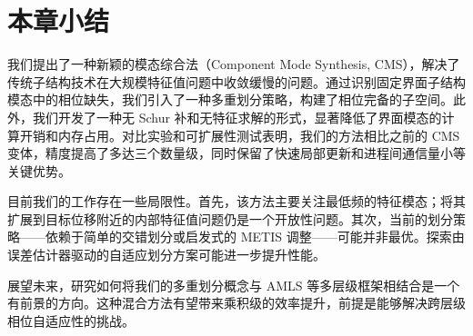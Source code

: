\section{本章小结}
我们提出了一种新颖的模态综合法（Component Mode Synthesis, CMS），解决了传统子结构技术在大规模特征值问题中收敛缓慢的问题。通过识别固定界面子结构模态中的相位缺失，我们引入了一种多重划分策略，构建了相位完备的子空间。此外，我们开发了一种无 Schur 补和无特征求解的形式，显著降低了界面模态的计算开销和内存占用。对比实验和可扩展性测试表明，我们的方法相比之前的 CMS 变体，精度提高了多达三个数量级，同时保留了快速局部更新和进程间通信量小等关键优势。

目前我们的工作存在一些局限性。首先，该方法主要关注最低频的特征模态；将其扩展到目标位移附近的内部特征值问题仍是一个开放性问题。其次，当前的划分策略——依赖于简单的交错划分或启发式的 METIS 调整——可能并非最优。探索由误差估计器驱动的自适应划分方案可能进一步提升性能。

展望未来，研究如何将我们的多重划分概念与 AMLS \cite{Bennighof2004AMLS} 等多层级框架相结合是一个有前景的方向。这种混合方法有望带来乘积级的效率提升，前提是能够解决跨层级相位自适应性的挑战。